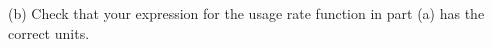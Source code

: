 \documentclass{ximera}
\begin{document}
\begin{question}
(b) Check that your expression for the usage rate function in part (a) has the correct units.



 
\begin{onlineOnly}
    \begin{center}
\end{center}
\end{onlineOnly}




\end{question}
\end{document}
